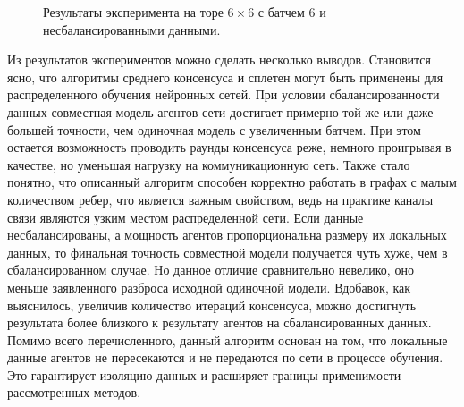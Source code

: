 \documentclass[a4paper,article,14pt]{extarticle}
\begin{document}
\begin{figure}[H]
\begin{center}
\caption{ \label{fig:torus6x6_unbalanced_b6}
     Результаты эксперимента на торе $6\times 6$ с батчем 6 и несбалансированными данными.}
\end{center}
\end{figure}

\pagebreak
{}
Из результатов экспериментов можно сделать несколько выводов. Становится ясно, что алгоритмы среднего консенсуса и сплетен могут быть применены для распределенного обучения нейронных сетей. При условии сбалансированности данных совместная модель агентов сети достигает примерно той же или даже большей точности, чем одиночная модель с увеличенным батчем. При этом остается возможность проводить раунды консенсуса реже, немного проигрывая в качестве, но уменьшая нагрузку на коммуникационную сеть. Также стало понятно, что описанный алгоритм способен корректно работать в графах с малым количеством ребер, что является важным свойством, ведь на практике каналы связи являются узким местом распределенной сети. Если данные несбалансированы, а мощность агентов пропорциональна размеру их локальных данных, то финальная точность совместной модели получается чуть хуже, чем в сбалансированном случае. Но данное отличие сравнительно невелико, оно меньше заявленного разброса исходной одиночной модели. Вдобавок, как выяснилось, увеличив количество итераций консенсуса, можно достигнуть результата более близкого к результату агентов на сбалансированных данных. Помимо всего перечисленного, данный алгоритм основан на том, что локальные данные агентов не пересекаются и не передаются по сети в процессе обучения. Это гарантирует изоляцию данных и расширяет границы применимости рассмотренных методов.
\end{document}
